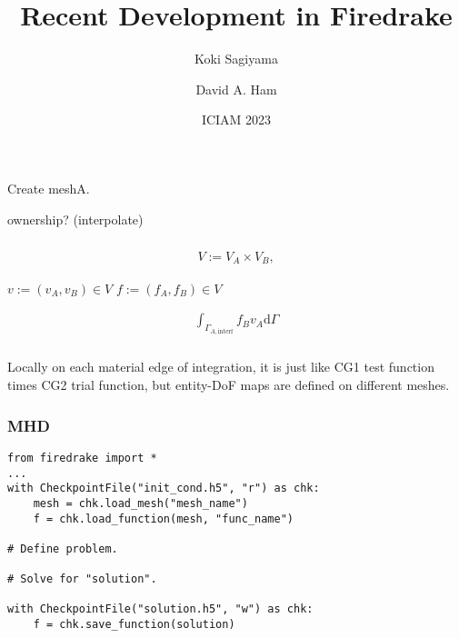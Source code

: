 \documentclass[]{beamer}
\newcommand{\dif}{\textrm{d}}
\begin{document}
    \title[]
              {Recent Development in \textsf{Firedrake}}
    \author{Koki Sagiyama \and David A. Ham}
    \date{ICIAM 2023}
\begin{frame}
    \titlepage
\end{frame}
\begin{frame}
\frametitle{}
\end{frame}
\begin{frame}
\frametitle{}
Create meshA.

ownership? (interpolate)

\end{frame}
\begin{frame}
\frametitle{}

\begin{align}
V:=V_A\times V_B,
\end{align}

$v:=(v_A, v_B)\in V$
$f:=(f_A, f_B)\in V$


\begin{align}
\int_{\Gamma_{A,\text{interf}}}f_Bv_A\dif\Gamma
\end{align}

\end{frame}
\begin{frame}
\frametitle{}

Locally on each material edge of integration,
it is just like CG1 test function times CG2 trial function, but
entity-DoF maps are defined on different meshes.


\end{frame}
\begin{frame}[fragile]
\frametitle{MHD}
\begin{verbatim}
from firedrake import *
...
with CheckpointFile("init_cond.h5", "r") as chk:
    mesh = chk.load_mesh("mesh_name")
    f = chk.load_function(mesh, "func_name")

# Define problem.

# Solve for "solution".

with CheckpointFile("solution.h5", "w") as chk:
    f = chk.save_function(solution)
\end{verbatim}
\end{frame}
\end{document}
